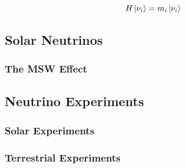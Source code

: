 \begin{equation}
    H \ket{\nu_i} = m_i \ket{\nu_i}
\end{equation}

\subsection{Solar Neutrinos}
\subsubsection{The MSW Effect}
\subsection{Neutrino Experiments}
\subsubsection{Solar Experiments}
\subsubsection{Terrestrial Experiments}


